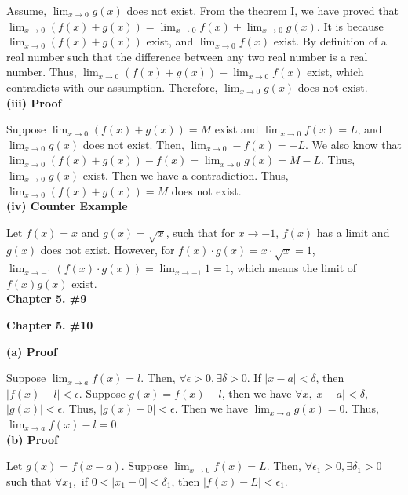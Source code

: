 \documentclass[a4paper,12pt]{report}
\begin{document}
\noindent
Assume, $\displaystyle{\lim_{x\to 0}}g(x)$ does not exist. From the theorem I, we have proved that $\displaystyle{\lim_{x\to 0}}(f(x)+g(x))=\displaystyle{\lim_{x\to 0}}f(x)+\displaystyle{\lim_{x\to 0}}g(x)$. It is because $\displaystyle{\lim_{x\to 0}}(f(x)+g(x))$ exist, and $\displaystyle{\lim_{x\to 0}}f(x)$ exist. By definition of a real number such that the difference between any two real number is a real number. Thus, $\displaystyle{\lim_{x\to 0}}(f(x)+g(x))-\displaystyle{\lim_{x\to 0}}f(x)$ exist, which contradicts with our assumption. Therefore, $\displaystyle{\lim_{x\to 0}}g(x)$ does not exist.\\

\noindent
\textbf{(iii) Proof}

\noindent
Suppose $\displaystyle{\lim_{x\to 0}}(f(x)+g(x)) = M$ exist and $\displaystyle{\lim_{x\to 0}}f(x) = L$, and $\displaystyle{\lim_{x\to 0}}g(x)$ does not exist. Then, $\displaystyle{\lim_{x\to 0}}-f(x) = -L$. We also know that $\displaystyle{\lim_{x\to 0}}(f(x)+g(x))-f(x) = \displaystyle{\lim_{x\to 0}}g(x) = M-L$. Thus, $\displaystyle{\lim_{x\to 0}}g(x)$ exist. Then we have a contradiction. Thus, $\displaystyle{\lim_{x\to 0}}(f(x)+g(x)) = M$ does not exist.\\

\noindent
\textbf{(iv) Counter Example}

\noindent
Let $f(x)=x$ and $g(x)=\sqrt{x}$, such that for $x\to -1$, $f(x)$ has a limit and $g(x)$ does not exist. However, for $f(x)\cdot{g(x)}=x\cdot{\sqrt{x}}=1$, $\displaystyle{\lim_{x\to -1}}(f(x)\cdot{g(x)})=\displaystyle{\lim_{x\to -1}}1=1$, which means the limit of $f(x)g(x)$ exist.\\

\noindent
\textbf{Chapter 5. \#9}

\noindent
\textbf{Chapter 5. \#10}

\noindent
\textbf{(a) Proof}

\noindent
Suppose $\displaystyle{\lim_{x\to a}}f(x)=l$. Then, $\forall \epsilon >0, \exists \delta >0$. If $|x-a|<\delta$, then $|f(x)-l|<\epsilon$. Suppose $g(x)=f(x)-l$, then we have $\forall x, |x-a|<\delta$, $|g(x)|<\epsilon$. Thus, $|g(x)-0|<\epsilon$. Then we have $\displaystyle{\lim_{x\to a}}g(x)=0$. Thus, $\displaystyle{\lim_{x\to a}}f(x)-l=0$.\\

\noindent
\textbf{(b) Proof}

\noindent
Let $g(x)=f(x-a)$. Suppose $\displaystyle{\lim_{x\to 0}}f(x)=L$. Then, $\forall \epsilon_1>0, \exists \delta_1>0$ such that $\forall x_1,$ if $0<|x_1-0|<\delta_1$, then $|f(x)-L|<\epsilon_1$.
\end{document}
